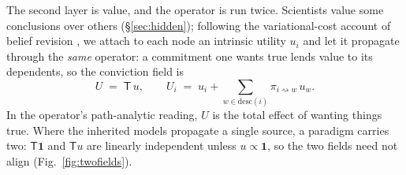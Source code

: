 \documentclass[runningheads]{llncs}
\newcommand{\desc}{\mathrm{desc}}
\newcommand{\rw}{\rightsquigarrow}
\newcommand{\Top}{\mathsf{T}}          %
\newcommand{\bone}{\mathbf{1}}         %
\begin{document}
The second layer is value, and the operator is run twice. Scientists value some conclusions over
others (\S\ref{sec:hidden}); following the variational-cost account of belief
revision \citep{hyland2025}, we attach to each node an intrinsic utility $u_i$ and let it propagate
through the \emph{same} operator: a commitment one wants true lends value to its dependents, so the
conviction field is
\begin{equation}
U \;=\; \Top\,u,
\qquad
U_i \;=\; u_i+\!\!\sum_{w\in\desc(i)}\!\!\pi_{i\rw w}\,u_w .
\label{eq:U}
\end{equation}
In the operator's path-analytic reading, $U$ is the total effect of wanting things true. Where the
inherited models propagate a single source, a paradigm carries two: $\Top\bone$ and $\Top u$ are
linearly independent unless $u\propto\bone$, so the two fields need not align
(Fig.~\ref{fig:twofields}).
\end{document}
